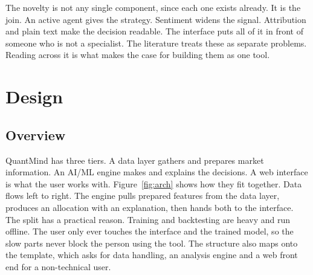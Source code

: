 \documentclass[12pt,twoside,letterpaper]{article}
\begin{document}
The novelty is not any single component, since each one exists already. It is the
join. An active agent gives the strategy. Sentiment widens the signal. Attribution
and plain text make the decision readable. The interface puts all of it in front of
someone who is not a specialist. The literature treats these as separate problems.
Reading across it is what makes the case for building them as one tool.

\section{Design}

\subsection{Overview}

QuantMind has three tiers. A data layer gathers and prepares market information. An
AI/ML engine makes and explains the decisions. A web interface is what the user
works with. Figure~\ref{fig:arch} shows how they fit together. Data flows left to
right. The engine pulls prepared features from the data layer, produces an
allocation with an explanation, then hands both to the interface. The split has a
practical reason. Training and backtesting are heavy and run offline. The user only
ever touches the interface and the trained model, so the slow parts never block the
person using the tool. The structure also maps onto the template, which asks for
data handling, an analysis engine and a web front end for a non-technical user.
\end{document}
